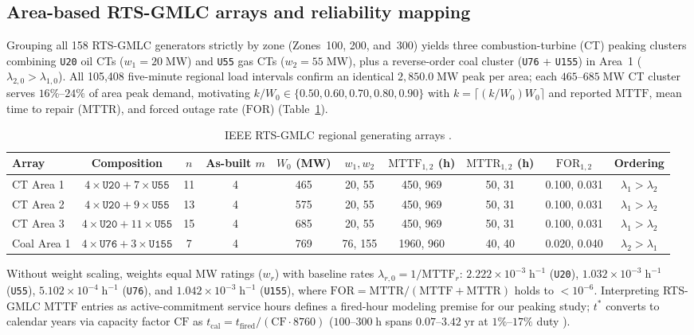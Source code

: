 \documentclass{elektr}
\begin{document}
\subsection{Area-based RTS-GMLC arrays and reliability mapping}
Grouping all 158 RTS-GMLC generators \cite{barrows2020} strictly by zone (Zones~100, 200, and~300) yields three combustion-turbine (CT) peaking clusters combining \texttt{U20} oil CTs ($w_1 = 20\;\text{MW}$) and \texttt{U55} gas CTs ($w_2 = 55\;\text{MW}$), plus a reverse-order coal cluster (\texttt{U76} + \texttt{U155}) in Area~1 ($\lambda_{2,0} > \lambda_{1,0}$). All 105,408 five-minute regional load intervals confirm an identical $2{,}850.0\;\text{MW}$ peak per area; each $465$--$685\;\text{MW}$ CT cluster serves $16\%$--$24\%$ of area peak demand, motivating $k/W_0 \in \{0.50, 0.60, 0.70, 0.80, 0.90\}$ with $k = \lceil (k/W_0) W_0 \rceil$ and reported $\mathrm{MTTF}$, mean time to repair ($\mathrm{MTTR}$), and forced outage rate ($\mathrm{FOR}$) (Table~\ref{tab:rts_arrays}).

\begin{table}[htbp]
\centering
\scriptsize
\renewcommand{\arraystretch}{0.80}
\setlength{\tabcolsep}{2.5pt}
\caption{IEEE RTS-GMLC regional generating arrays \cite{barrows2020}.}
\label{tab:rts_arrays}
\begin{tabular*}{\textwidth}{@{\extracolsep{\fill}}lccccccccc@{}}
\toprule
Array & Composition & $n$ & As-built $m$ & $W_0$ (MW) & $w_1, w_2$ & $\mathrm{MTTF}_{1,2}$ (h) & $\mathrm{MTTR}_{1,2}$ (h) & $\mathrm{FOR}_{1,2}$ & Ordering \\
\midrule
CT Area 1   & $4\times\texttt{U20} + 7\times\texttt{U55}$  & 11 & 4 & 465 & 20, 55  & 450, 969  & 50, 31 & 0.100, 0.031 & $\lambda_1 > \lambda_2$ \\
CT Area 2   & $4\times\texttt{U20} + 9\times\texttt{U55}$  & 13 & 4 & 575 & 20, 55  & 450, 969  & 50, 31 & 0.100, 0.031 & $\lambda_1 > \lambda_2$ \\
CT Area 3   & $4\times\texttt{U20} + 11\times\texttt{U55}$ & 15 & 4 & 685 & 20, 55  & 450, 969  & 50, 31 & 0.100, 0.031 & $\lambda_1 > \lambda_2$ \\
Coal Area 1 & $4\times\texttt{U76} + 3\times\texttt{U155}$ & 7  & 4 & 769 & 76, 155 & 1960, 960 & 40, 40 & 0.020, 0.040 & $\lambda_2 > \lambda_1$ \\
\bottomrule
\end{tabular*}
\end{table}

Without weight scaling, weights equal MW ratings ($w_r$) with baseline rates $\lambda_{r,0} = 1/\mathrm{MTTF}_r$: $2.222 \times 10^{-3}\;\text{h}^{-1}$ (\texttt{U20}), $1.032 \times 10^{-3}\;\text{h}^{-1}$ (\texttt{U55}), $5.102 \times 10^{-4}\;\text{h}^{-1}$ (\texttt{U76}), and $1.042 \times 10^{-3}\;\text{h}^{-1}$ (\texttt{U155}), where $\mathrm{FOR} = \mathrm{MTTR}/(\mathrm{MTTF} + \mathrm{MTTR})$ holds to $< 10^{-6}$. Interpreting RTS-GMLC $\mathrm{MTTF}$ entries as active-commitment service hours defines a fired-hour modeling premise for our peaking study; $t^*$ converts to calendar years via capacity factor $\mathrm{CF}$ as $t_{\mathrm{cal}} = t_{\mathrm{fired}}/(\mathrm{CF}\cdot 8760)$ ($100$--$300\;\text{h}$ spans $0.07$--$3.42\;\text{yr}$ at $1\%$--$17\%$ duty \cite{ger3620}).
\end{document}
